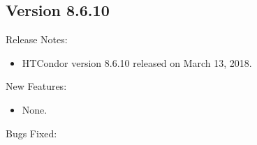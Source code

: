 \subsection*{\label{sec:New-8-6-10}Version 8.6.10}

\noindent Release Notes:

\begin{itemize}

\item HTCondor version 8.6.10 released on March 13, 2018.

\end{itemize}


\noindent New Features:

\begin{itemize}

\item None.

\end{itemize}

\noindent Bugs Fixed:

